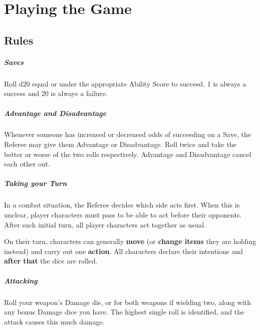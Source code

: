 \documentclass[itdr]{subfiles}
\begin{document}
\cleartoleftpage

\chapter{Playing the Game}

\section{Rules}

\paragraph{Saves}
Roll d20 equal or under the appropriate Ability Score to succeed. 1 is always a success and 20 is \mbox{always} a failure.

\vfill

\paragraph{Advantage and Disadvantage}
Whenever someone has increased or decreased odds of succeeding on a Save, the Referee may give them Advantage or Disadvantage. Roll twice and take the better or worse of the two rolls respectively. Advantage and Disadvantage cancel each other out.

\vfill

\paragraph{Taking your Turn}
In a combat situation, the Referee decides which side acts first. When this is unclear, player characters must pass  to be able to act before their opponents. After such initial turn, all player characters act together as usual.

On their turn, characters can generally \textbf{move} (or \textbf{change items} they are holding instead) and carry out one \textbf{action}. All characters declare their \mbox{intentions} and \textbf{after that} the dice are rolled.

\vfill

\paragraph{Attacking}
Roll your weapon's Damage die, or for both weapons if wielding two, along with any bonus Damage dice you have. The highest single roll is identified, and the attack causes this much damage.
\end{document}
